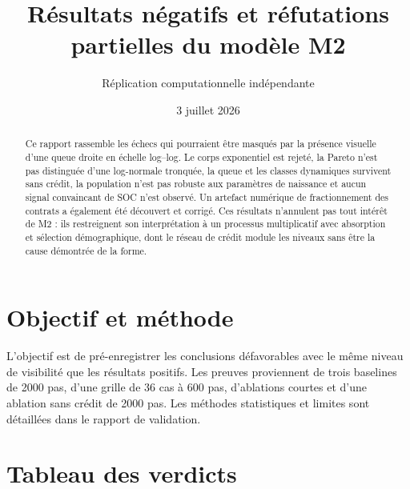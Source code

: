 \documentclass[11pt,a4paper]{article}
\title{Résultats négatifs et réfutations partielles du modèle M2}
\author{Réplication computationnelle indépendante}
\date{3 juillet 2026}
\begin{document}
\maketitle

\begin{abstract}
Ce rapport rassemble les échecs qui pourraient être masqués par la présence
visuelle d'une queue droite en échelle log--log. Le corps exponentiel est rejeté,
la Pareto n'est pas distinguée d'une log-normale tronquée, la queue et les classes
dynamiques survivent sans crédit, la population n'est pas robuste aux paramètres
de naissance et aucun signal convaincant de SOC n'est observé. Un artefact
numérique de fractionnement des contrats a également été découvert et corrigé.
Ces résultats n'annulent pas tout intérêt de M2 : ils restreignent son
interprétation à un processus multiplicatif avec absorption et sélection
démographique, dont le réseau de crédit module les niveaux sans être la cause
démontrée de la forme.
\end{abstract}

\section{Objectif et méthode}

L'objectif est de pré-enregistrer les conclusions défavorables avec le même
niveau de visibilité que les résultats positifs. Les preuves proviennent de
trois baselines de 2000 pas, d'une grille de 36 cas à 600 pas, d'ablations courtes
et d'une ablation sans crédit de 2000 pas. Les méthodes statistiques et limites
sont détaillées dans le rapport de validation.

\section{Tableau des verdicts}
\end{document}
